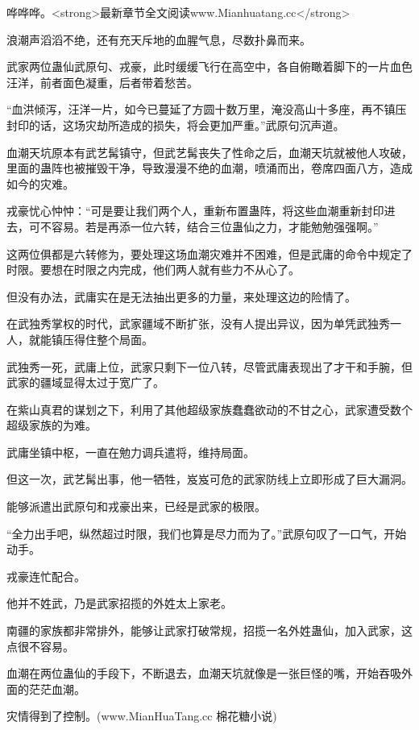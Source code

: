 
\begin{this_body}

哗哗哗。<strong>最新章节全文阅读www.Mianhuatang.cc</strong>

浪潮声滔滔不绝，还有充天斥地的血腥气息，尽数扑鼻而来。

武家两位蛊仙武原句、戎豪，此时缓缓飞行在高空中，各自俯瞰着脚下的一片血色汪洋，前者面色凝重，后者带着愁苦。

“血洪倾泻，汪洋一片，如今已蔓延了方圆十数万里，淹没高山十多座，再不镇压封印的话，这场灾劫所造成的损失，将会更加严重。”武原句沉声道。

血潮天坑原本有武艺髯镇守，但武艺髯丧失了性命之后，血潮天坑就被他人攻破，里面的蛊阵也被摧毁干净，导致漫漫不绝的血潮，喷涌而出，卷席四面八方，造成如今的灾难。

戎豪忧心忡忡：“可是要让我们两个人，重新布置蛊阵，将这些血潮重新封印进去，可不容易。若是再添一位六转，结合三位蛊仙之力，才能勉勉强强啊。”

这两位俱都是六转修为，要处理这场血潮灾难并不困难，但是武庸的命令中规定了时限。要想在时限之内完成，他们两人就有些力不从心了。

但没有办法，武庸实在是无法抽出更多的力量，来处理这边的险情了。

在武独秀掌权的时代，武家疆域不断扩张，没有人提出异议，因为单凭武独秀一人，就能镇压得住整个局面。

武独秀一死，武庸上位，武家只剩下一位八转，尽管武庸表现出了才干和手腕，但武家的疆域显得太过于宽广了。

在紫山真君的谋划之下，利用了其他超级家族蠢蠢欲动的不甘之心，武家遭受数个超级家族的为难。

武庸坐镇中枢，一直在勉力调兵遣将，维持局面。

但这一次，武艺髯出事，他一牺牲，岌岌可危的武家防线上立即形成了巨大漏洞。

能够派遣出武原句和戎豪出来，已经是武家的极限。

“全力出手吧，纵然超过时限，我们也算是尽力而为了。”武原句叹了一口气，开始动手。

戎豪连忙配合。

他并不姓武，乃是武家招揽的外姓太上家老。

南疆的家族都非常排外，能够让武家打破常规，招揽一名外姓蛊仙，加入武家，这点很不容易。

血潮在两位蛊仙的手段下，不断退去，血潮天坑就像是一张巨怪的嘴，开始吞吸外面的茫茫血潮。

灾情得到了控制。(www.MianHuaTang.cc 棉花糖小说)


\end{this_body}

